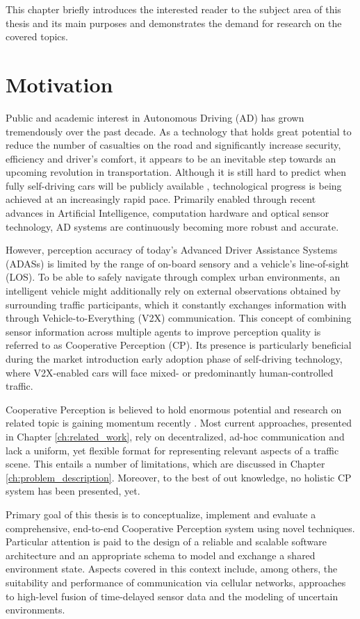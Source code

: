This chapter briefly introduces the interested reader to the subject area of this thesis and its main purposes and demonstrates the demand for research on the covered topics. 

\section{Motivation}
\label{sec:motivation}
Public and academic interest in Autonomous Driving (AD) has grown tremendously over the past decade. As a technology that holds great potential to reduce the number of casualties on the road and significantly increase security, efficiency and driver's comfort, it appears to be an inevitable step towards an upcoming revolution in transportation.
Although it is still hard to predict when fully self-driving cars will be publicly available \cite{Frost&SulivanConsulting2018}, technological progress is being achieved at an increasingly rapid pace. Primarily enabled through recent advances in Artificial Intelligence, computation hardware and optical sensor technology, AD systems are continuously becoming more robust and accurate.
\par
\bigskip

However, perception accuracy of today's Advanced Driver Assistance Systems (ADASs) is limited by the range of on-board sensory and a vehicle's line-of-sight (LOS). To be able to safely navigate through complex urban environments, an intelligent vehicle might additionally rely on external observations obtained by surrounding traffic participants, which it constantly exchanges information with through Vehicle-to-Everything (V2X) communication. This concept of combining sensor information across multiple agents to improve perception quality is referred to as Cooperative Perception (CP). Its presence is particularly beneficial during the market introduction early adoption phase of self-driving technology, where V2X-enabled cars will face mixed- or predominantly human-controlled traffic.  
\par
\bigskip

Cooperative Perception is believed to hold enormous potential \cite{Gunther2015} and research on related topic is gaining momentum recently \cite{Chen2019, Thandavarayan2019, Calvo2017}. Most current approaches, presented in Chapter \ref{ch:related_work}, rely on decentralized, ad-hoc communication and lack a uniform, yet flexible format for representing relevant aspects of a traffic scene. This entails a number of limitations, which are discussed in Chapter \ref{ch:problem_description}. Moreover, to the best of out knowledge, no holistic CP system has been presented, yet. 
\par
\bigskip

Primary goal of this thesis is to conceptualize, implement and evaluate a comprehensive, end-to-end Cooperative Perception system using novel techniques. Particular attention is paid to the design of a reliable and scalable software architecture and an appropriate schema to model and exchange a shared environment state. Aspects covered in this context include, among others, the suitability and performance of communication via cellular networks, approaches to high-level fusion of time-delayed sensor data and the modeling of uncertain environments. 